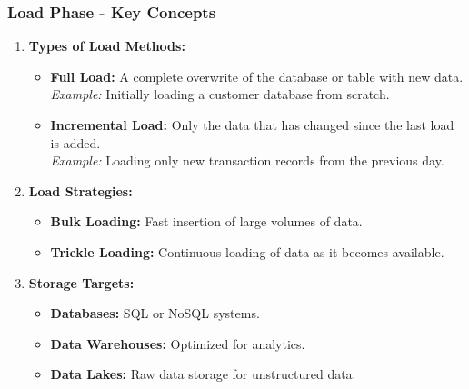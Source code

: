 \documentclass[aspectratio=169]{beamer}
\begin{document}
\begin{frame}[fragile]
    \frametitle{Load Phase - Key Concepts}
    \begin{enumerate}
        \item \textbf{Types of Load Methods:}
        \begin{itemize}
            \item \textbf{Full Load:} A complete overwrite of the database or table with new data.\\
            \textit{Example:} Initially loading a customer database from scratch.
            \item \textbf{Incremental Load:} Only the data that has changed since the last load is added.\\
            \textit{Example:} Loading only new transaction records from the previous day.
        \end{itemize}
        
        \item \textbf{Load Strategies:}
        \begin{itemize}
            \item \textbf{Bulk Loading:} Fast insertion of large volumes of data.
            \item \textbf{Trickle Loading:} Continuous loading of data as it becomes available.
        \end{itemize}
        
        \item \textbf{Storage Targets:}
        \begin{itemize}
            \item \textbf{Databases:} SQL or NoSQL systems.
            \item \textbf{Data Warehouses:} Optimized for analytics.
            \item \textbf{Data Lakes:} Raw data storage for unstructured data.
        \end{itemize}
    \end{enumerate}
\end{frame}
\end{document}
